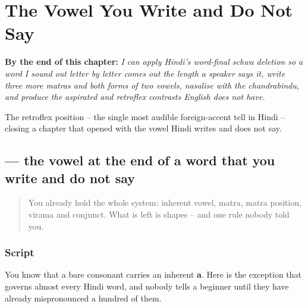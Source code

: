 
\chapter{The Vowel You Write and Do Not Say}
\label{ch:hi-script-second-wave}

\begin{chapteropening}
\textbf{By the end of this chapter:} \emph{I can apply Hindi's word-final schwa deletion so a word I sound out letter by letter comes out the length a speaker says it, write three more matras and both forms of two vowels, nasalise with the chandrabindu, and produce the aspirated and retroflex contrasts English does not have.}

The retroflex position -- the single most audible foreign-accent tell in Hindi -- closing a chapter that opened with the vowel Hindi writes and does not say.
\end{chapteropening}

\section[\texorpdfstring{\hi{नाम} (nām)}{नाम (nām)}]{ — the vowel at the end of a word that you write and do not say}

\label{lesson:HI-W12-schwa-drop}



\begin{quote}
You already hold the whole system: inherent vowel, matra, matra position, virama and conjunct. What is left is shapes -- and one rule nobody told you.
\end{quote}

\subsection*{Script}

You know that a bare consonant carries an inherent \textbf{a}. Here is the exception that governs almost every Hindi word, and nobody tells a beginner until they have already mispronounced a hundred of them.

